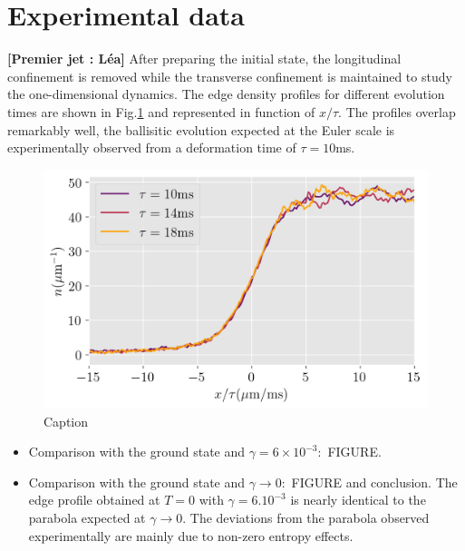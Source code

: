 \documentclass[submission, Phys]{SciPost}
\begin{document}


\section{Experimental data}
{\bf [Premier jet : Léa]}
After preparing the initial state, the longitudinal confinement is removed while the transverse confinement is maintained to study the one-dimensional dynamics. The edge density profiles for different evolution times are shown in Fig.\ref{fig:euler} and represented in function of $x /\tau$. The profiles overlap remarkably well, the ballisitic evolution expected at the Euler scale is experimentally observed from a deformation time of $\tau = 10$ms. 

\begin{figure}[!htb]
    \centering
    \includegraphics[width=0.7\linewidth]{Figures/Hydroscaling_DWD.png}
    \caption{Caption}
    \label{fig:euler}
\end{figure}



\begin{itemize}
    \item Comparison with the ground state and $\gamma = 6 \times 10^{-3} : $ FIGURE. 
    \item Comparison with the ground state and $\gamma \to 0 : $ FIGURE and conclusion. The edge profile obtained at $T=0$ with $\gamma = 6.10^{-3}$ is nearly identical to the parabola expected at $\gamma \to 0$. The deviations from the parabola observed experimentally are mainly due to non-zero entropy effects. 
\end{itemize}
\end{document}
